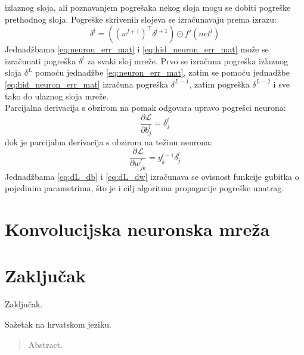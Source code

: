 \documentclass[times, utf8, zavrsni, numeric]{fer}
\begin{document}
izlaznog sloja, ali poznavanjem pogrešaka nekog sloja mogu se dobiti 
pogreške prethodnog sloja. Pogreške skrivenih slojeva se izračunavaju
prema izrazu:
\begin{equation}
	\delta^l = ((w^{l+1})^\top \delta^{l+1}) \odot f'(net^l)
	\label{eq:hid_neuron_err_mat}
\end{equation}
Jednadžbama \ref{eq:neuron_err_mat} i \ref{eq:hid_neuron_err_mat} može se
izračunati pogreška $\delta^l$ za svaki sloj mreže. Prvo se izračuna
pogreška izlaznog sloja $\delta^L$ pomoću jednadžbe \ref{eq:neuron_err_mat},
zatim se pomoću jednadžbe \ref{eq:hid_neuron_err_mat} izračuna pogreška
$\delta^{L-1}$, zatim pogreška $\delta^{L-2}$ i sve tako do ulaznog sloja
mreže.\\\indent
Parcijalna derivacija s obzirom na pomak odgovara upravo pogrešci neurona:
\begin{equation}
	\frac{\partial \mathcal{L}}{\partial b_j^l} = \delta_j^l
	\label{eq:dL_db}
\end{equation}
dok je parcijalna derivacija s obzirom na težinu neurona:
\begin{equation}
	\frac{\partial \mathcal{L}}{\partial w_{jk}^l} = y_k^{l-1} \delta_j^l
	\label{eq:dL_dw}
\end{equation}
Jednadžbama \ref{eq:dL_db} i \ref{eq:dL_dw} izračunava se ovisnost funkcije
gubitka o
pojedinim parametrima, što je i cilj algoritma propagacije pogreške unatrag.

\chapter{Konvolucijska neuronska mreža}

\chapter{Zaključak}
Zaključak.



\nocite{Cupic-UNN}
\nocite{Goodfellow-et-al-2016}


\begin{sazetak}
Sažetak na hrvatskom jeziku.

\end{sazetak}

\begin{abstract}
Abstract.

\end{abstract}
\end{document}
